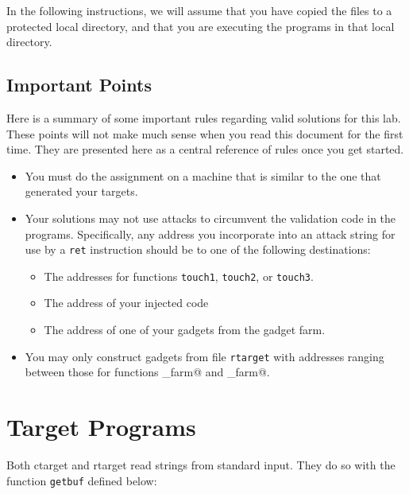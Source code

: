 \documentclass[11pt]{article}
\newenvironment{ccode}%
{\small}%
{}
\begin{document}
In the following instructions, we will assume that you have copied the
files to a protected local directory, and that you are
executing the programs in that local directory.

\subsection{Important Points}

Here is a summary of some important rules regarding valid solutions
for this lab.  These points will not make much sense when you read
this document for the first time.  They are presented here as a
central reference of rules once you get started.

\begin{itemize}
\item
You must do the assignment on a machine that is similar to the one that generated 
your targets. 

\item Your solutions may not use attacks to circumvent the validation
  code in the programs.  Specifically, any address you incorporate
  into an attack string for use by a {\tt ret} instruction should be
  to one of the following destinations:
\begin{itemize}
\item The addresses for functions {\tt touch1}, {\tt touch2}, or {\tt touch3}.

\item The address of your injected code

\item The address of one of your gadgets from the gadget farm.
\end{itemize}

\item You may only construct gadgets from file {\tt rtarget} with
  addresses ranging between those for functions \verb@start_farm@ and
  \verb@end_farm@.

\end{itemize}

\section{Target Programs}

Both {\sc ctarget} and {\sc rtarget}
read strings from standard input. They do so
with the function {\tt getbuf} defined below:

\begin{ccode}

\end{ccode}
\end{document}
